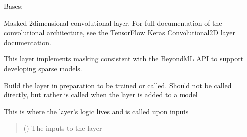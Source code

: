\documentclass[letterpaper,10pt,english]{sphinxmanual}
\begin{document}
\begin{fulllineitems}
\label{\detokenize{beyondml.tflow.layers:beyondml.tflow.layers.MaskedConv2D.MaskedConv2D}}
\pysigstartsignatures
{}
\pysigstopsignatures
\sphinxAtStartPar
Bases: 

\sphinxAtStartPar
Masked 2\sphinxhyphen{}dimensional convolutional layer. For full documentation of the convolutional architecture, see the
TensorFlow Keras Convolutional2D layer documentation.

\sphinxAtStartPar
This layer implements masking consistent with the BeyondML API to support developing sparse models.

\begin{fulllineitems}
\label{\detokenize{beyondml.tflow.layers:beyondml.tflow.layers.MaskedConv2D.MaskedConv2D.build}}
\pysigstartsignatures
{}
\pysigstopsignatures
\sphinxAtStartPar
Build the layer in preparation to be trained or called. Should not be called directly,
but rather is called when the layer is added to a model

\end{fulllineitems}


\begin{fulllineitems}
\label{\detokenize{beyondml.tflow.layers:beyondml.tflow.layers.MaskedConv2D.MaskedConv2D.call}}
\pysigstartsignatures
{}
\pysigstopsignatures
\sphinxAtStartPar
This is where the layer’s logic lives and is called upon inputs
\begin{quote}\begin{description}
\sphinxAtStartPar
{} () \textendash{} The inputs to the layer


\end{description}
\end{quote}
\end{fulllineitems}
\end{fulllineitems}
\end{document}
